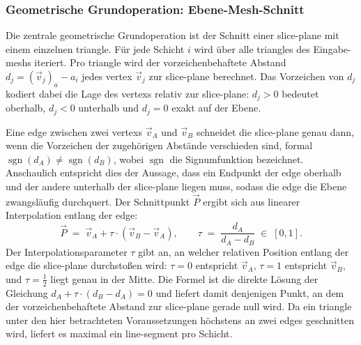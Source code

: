             \subsubsection{Geometrische Grundoperation: Ebene-Mesh-Schnitt}\label{subsubsec:concept-planar-plane-intersection} 
                Die zentrale geometrische Grundoperation ist der Schnitt einer \gls{slice-plane} mit einem einzelnen \gls{triangle}.
                Für jede Schicht $i$ wird über alle \glspl{triangle} des Eingabe-\glspl{mesh} iteriert.
                Pro \gls{triangle} wird der vorzeichenbehaftete Abstand $d_j = (\vec{v}_j)_a - a_i$ jedes \gls{vertex} $\vec{v}_j$ zur \gls{slice-plane} berechnet.
                Das Vorzeichen von $d_j$ kodiert dabei die Lage des \glspl{vertex} relativ zur \gls{slice-plane}: $d_j > 0$ bedeutet oberhalb, $d_j < 0$ unterhalb und $d_j = 0$ exakt auf der Ebene.

                Eine \gls{edge} zwischen zwei \glspl{vertex} $\vec{v}_A$ und $\vec{v}_B$ schneidet die \gls{slice-plane} genau dann, wenn die Vorzeichen der zugehörigen Abstände verschieden sind, formal $\operatorname{sgn}(d_A) \neq \operatorname{sgn}(d_B)$, wobei $\operatorname{sgn}$ die Signumfunktion bezeichnet.
                Anschaulich entspricht dies der Aussage, dass ein Endpunkt der \gls{edge} oberhalb und der andere unterhalb der \gls{slice-plane} liegen muss, sodass die \gls{edge} die Ebene zwangsläufig durchquert.
                Der Schnittpunkt $\vec{P}$ ergibt sich aus linearer Interpolation entlang der \gls{edge}:
                \begin{equation}
                    \vec{P} \;=\; \vec{v}_A + \tau \cdot (\vec{v}_B - \vec{v}_A),
                    \qquad
                    \tau \;=\; \frac{d_A}{d_A - d_B} \;\in\; [0, 1].
                    \label{eq:concept-planar-edge-intersection}
                \end{equation}
                Der Interpolationsparameter $\tau$ gibt an, an welcher relativen Position entlang der \gls{edge} die \gls{slice-plane} durchstoßen wird: $\tau = 0$ entspricht $\vec{v}_A$, $\tau = 1$ entspricht $\vec{v}_B$, und $\tau = \tfrac{1}{2}$ liegt genau in der Mitte.
                Die Formel ist die direkte Lösung der Gleichung $d_A + \tau \cdot (d_B - d_A) = 0$ und liefert damit denjenigen Punkt, an dem der vorzeichenbehaftete Abstand zur \gls{slice-plane} gerade null wird.
                Da ein \gls{triangle} unter den hier betrachteten Voraussetzungen höchstens an zwei \glspl{edge} geschnitten wird, liefert es maximal ein \gls{line-segment} pro Schicht.

